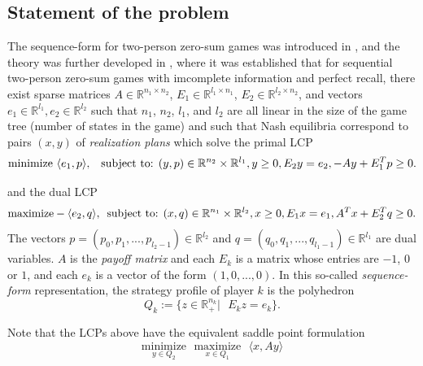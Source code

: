 \documentclass{article} %
\begin{document}
\subsection{Statement of the problem}
The sequence-form for two-person zero-sum games was introduced in
\cite{koller1992complexity}, and the theory was further developed in
\cite{koller1994fast,von1996efficient,vonequilibrium}, where it was
established that for sequential two-person zero-sum games with
imcomplete information and perfect recall, there exist sparse matrices
$A \in \mathbb{R}^{n_1 \times n_2}$, $E_1 \in \mathbb{R}^{l_1 \times
  n_1}$, $E_2 \in \mathbb{R}^{l_2 \times n_2}$, and vectors $e_1 \in
\mathbb{R}^{l_1}, e_2 \in \mathbb{R}^{l_2}$ such that $n_1$, $n_2$,
$l_1$, and $l_2$ are all linear in the size of the game tree (number
of states in the game) and such that Nash equilibria correspond to
pairs $(x, y)$ of \textit{realization plans} which solve the primal
LCP
\begin{equation}
  \begin{aligned}
     \text{minimize }\langle e_1, p\rangle, \hspace{.5em}\text{
       subject to: }(y,p) \in \mathbb{R}^{n_2} \times
     \mathbb{R}^{l_1},  y \ge 0, E_2y = e_2, -Ay + E_1^Tp \geq 0.
  \end{aligned}
  \label{eq:primal_pb}
\end{equation}

and the dual LCP
\begin{equation}
  \begin{aligned}
    \text{maximize}-\langle e_2, q\rangle,\hspace{.5em}\text{subject
      to: }(x,q) \in \mathbb{R}^{n_1} \times \mathbb{R}^{l_2},  x \ge
    0, E_1x = e_1, A^Tx + E_2^Tq \geq 0.
  \end{aligned}
  \label{eq:dual_pb}
\end{equation}
The vectors $p = (p_0, p_1, ..., p_{l_2 - 1}) \in \mathbb{R}^{l_2}$
and $q = (q_0, q_1, ..., q_{l_1 - 1}) \in \mathbb{R}^{l_1}$ are dual
variables. 
$A$ is the \textit{payoff matrix} and each $E_k$ is a matrix whose
entries are $-1$, $0$ or $1$, and each $e_k$ is a vector of the form
$(1, 0, ..., 0)$. In this so-called \textit{sequence-form}
representation, the strategy profile of player $k$ is the polyhedron
\begin{equation}
  Q_k := \{z \in \mathbb{R}^{n_k}_+ |\text{ }E_kz = e_k\}.
\label{eq:polyhedron}
\end{equation}

Note that the LCPs above have the equivalent saddle point formulation
\begin{equation}
  \underset{y \in Q_2}{\text{minimize}}\text{ }\underset{x \in
    Q_1}{\text{maximize}}\text{ }\langle x, Ay\rangle
  \label{eq:gilpin}
\end{equation}
\end{document}
